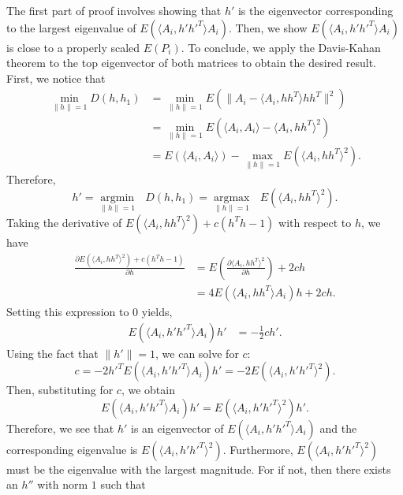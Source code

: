 \documentclass[10pt,journal,compsoc]{IEEEtran}
\newenvironment{proof}[1][Proof]{\begin{trivlist}
		\item[\hskip \labelsep {\bfseries #1}]}{\end{trivlist}}
\begin{document}
\begin{proof} [Proof of Theorem 4.2]
The first part of proof involves showing that $h'$ is the eigenvector corresponding to the largest eigenvalue of $E(\langle A_{i},h' h'^T \rangle A_{i})$. Then, we show $E(\langle A_{i},h' h'^T \rangle A_{i})$ is close to a properly scaled $E(P_i)$. To conclude, we apply the Davis-Kahan theorem to the top eigenvector of both matrices to obtain the desired result. First, we notice that
	\begin{align*}
	\underset{\|h\| =1}{\operatorname{min}}D(h,h_1) &=\underset{\|h\| =1}{\operatorname{min}}E(\|A_i- \langle A_i,h h^T \rangle h h^T\|^2) \\
	&=\underset{\|h\| =1}{\operatorname{min}}E(\langle A_i,A_i \rangle- \langle A_i,h h^T \rangle ^2) \\
	&=E(\langle A_i,A_i \rangle)-\underset{\|h\| =1}{\operatorname{max}}E( \langle A_i,h h^T \rangle ^2).
	\end{align*}
	Therefore, 
	\begin{equation} \label{eq:5}
	h'= \underset{\|h\| =1}{\operatorname{argmin}} \text{ }D(h,h_1)=\underset{\|h\| =1}{\operatorname{argmax}} \text{ } E(\langle A_i,h h^T \rangle ^2) .
	\end{equation}
	Taking the derivative of $E( \langle A_i,h h^T \rangle ^2)+ c(h^Th-1)$ with respect to $h$, we have 
	\begin{align*}
	\frac{\partial E( \langle A_i,h h^T \rangle ^2)+ c(h^Th-1) }{\partial h} & =  E(\frac{\partial  \langle A_i,h h^T \rangle ^2}{\partial h}) +2ch \\
	&=4 E( \langle A_i,h h^T \rangle A_i)h +2ch .
	\end{align*}
	Setting this expression to $0$ yields,
	\begin{align*} 
	E( \langle A_i,h' h'^T \rangle A_i)h' & = -\frac{1}{2}ch' .
	\end{align*}
	Using the fact that $\|h'\|=1$, we can solve for $c$:
	\[c = -2 h'^T E( \langle A_i,h' h'^T \rangle A_i)h' = -2 E( \langle A_i,h' h'^T \rangle^2) .\]
	Then, substituting for $c$, we obtain
	\begin{equation}
	E( \langle A_i,h' h'^T \rangle A_i)h'=E( \langle A_i,h' h'^T \rangle^2)h'.
	\end{equation}
	Therefore, we see that $h'$ is an eigenvector of $E(\langle A_{i},h' h'^T \rangle A_{i})$ and the corresponding eigenvalue is $E(\langle A_{i},h' h'^T \rangle ^2)$. Furthermore, $E(\langle A_{i},h' h'^T \rangle ^2)$ must be the eigenvalue with the largest magnitude. For if not, then there exists an $h''$ with norm $1$ such that

\end{proof}
\end{document}
